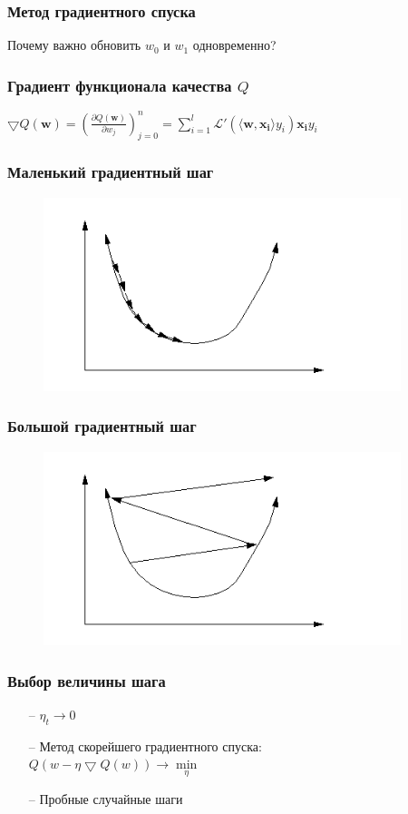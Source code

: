 \documentclass[12pt]{beamer}
\begin{document}
\begin{frame}\frametitle{Метод градиентного спуска}
Почему важно обновить $w_0$ и $w_1$ одновременно?
\end{frame}

\begin{frame}\frametitle{Градиент функционала качества $Q$}
$\bigtriangledown Q(\mathbf{w}) = (\frac{\partial Q(\mathbf{w})}{\partial w_j})_{j=0}^n = \sum\limits_{i=1}^l \mathcal{L}'(\langle \mathbf{w}, \mathbf{x_i} \rangle y_i) \mathbf{x_i} y_i$\\
\end{frame}

\begin{frame}\frametitle{Маленький градиентный шаг}
\begin{figure}[htbp]
  \includegraphics[height=160pt, keepaspectratio = true]{images/learning_rate_small}   
\end{figure}
\end{frame}

\begin{frame}\frametitle{Большой градиентный шаг}
\begin{figure}[htbp]
  \includegraphics[height=160pt, keepaspectratio = true]{images/learning_rate_large}   
\end{figure}
\end{frame}

\begin{frame}\frametitle{Выбор величины шага}
\begin{itemize}
\item[--] $\eta_t \rightarrow 0$\\
\item[--] Метод скорейшего градиентного спуска:\\
$Q(w - \eta \bigtriangledown Q(w)) \rightarrow \min\limits_{\eta}$
\item[--] Пробные случайные шаги
\end{itemize}
\end{frame}
\end{document}
